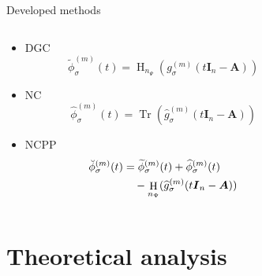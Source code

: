 \documentclass[aspectratio=169, leqno, 12pt]{beamer}
\newcommand{\mtx}[1]{\boldsymbol{#1}}
\DeclareMathOperator{\Tr}{Tr}
\DeclareMathOperator{\Hutch}{H}
\begin{document}
\begin{frame}{Developed methods}
    \begin{columns}
        \begin{column}{0.55\textwidth}
            \begin{itemize}
                \item \gls{DGC}
                \begin{equation}
                    \widetilde{\phi}_{\sigma}^{(m)}(t) = \Hutch_{n_{\Psi}}(g_{\sigma}^{(m)}(t\mtx{I}_n - \mtx{A}))
                \end{equation}
                \item \gls{NC}
                \begin{equation}
                    \widehat{\phi}_{\sigma}^{(m)}(t) = \Tr(\widehat{g}_{\sigma}^{(m)}(t\mtx{I}_n - \mtx{A}))
                \end{equation}
                \item \gls{NCPP}
                \begin{align}
                    \breve{\phi}_{\sigma}^{(m)}(t) &= \widetilde{\phi}_{\sigma}^{(m)}(t) + \widehat{\phi}_{\sigma}^{(m)}(t) \notag \\
                    &\hspace{10pt}- \Hutch_{n_{\Psi}}(\widehat{g}_{\sigma}^{(m)}(t\mtx{I}_n - \mtx{A}))
                \end{align}
            \end{itemize}
        \end{column}
        \begin{column}{0.45\textwidth}
            \scalebox{0.7}{}
        \end{column}
    \end{columns}
\end{frame}

\section{Theoretical analysis}
\end{document}
